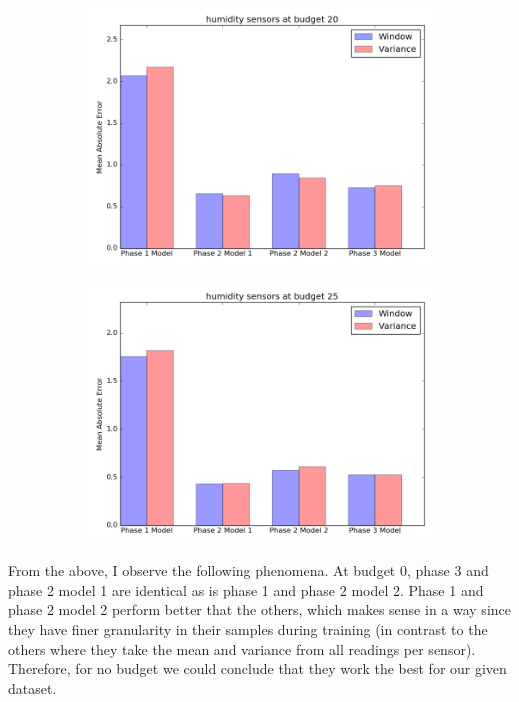 \documentclass{article}
\begin{document}
\begin{figure}[h!]
	\begin{subfigure}{\linewidth}
	\includegraphics[scale=0.5]{humidity_20_final.png}
	\end{subfigure}
	\begin{subfigure}{\linewidth}
	\includegraphics[scale=0.5]{humidity_25_final.png}
	\end{subfigure}
\end{figure}

\newpage

From the above, I observe the following phenomena. At
budget 0,  phase 3 and phase 2 model 1 are identical
as is phase 1 and phase 2 model 2. Phase 1 and phase
2 model 2 perform better that the others, which makes
sense in a way since they have finer granularity in
their samples during training (in contrast to the others
where they take the mean and variance from all readings
per sensor). Therefore, for no budget we could conclude
that they work the best for our given dataset.
\end{document}
